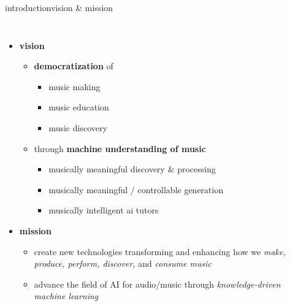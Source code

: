 \begin{frame}{introduction}{vision \& mission}
    \vspace{-7mm}
    \begin{columns}
        \begin{itemize}
            \item<1->   \textbf{vision}
            \begin{itemize}
                \item \textbf{democratization} of 
                    \begin{itemize}
                        \item music making
                        \item music education
                        \item music discovery
                    \end{itemize}
                \smallskip
                \item<2->[$\Rightarrow$] through \textbf{machine understanding of music} 
                    \begin{itemize}
                        \item   musically meaningful discovery \& processing
                        \item   musically meaningful / controllable generation
                        \item   musically intelligent ai tutors
                    \end{itemize}
            \end{itemize}
        \smallskip
        \item<3->   \textbf{mission}
            \begin{itemize}
                \item   create new technologies transforming and enhancing how we \textit{make, produce, perform, discover,} and \textit{consume music}
                \item   advance the field of AI for audio/music through \textit{knowledge-driven machine learning}
            \end{itemize}
        \end{itemize}
    \end{columns}
\end{frame}

